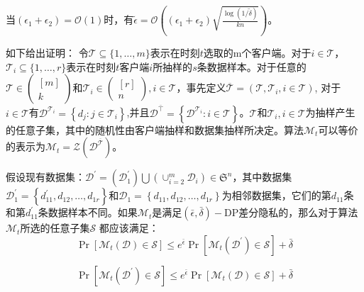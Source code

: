 当$\left(\epsilon_{1}+\epsilon_{2}\right)=\mathcal{O}(1)$时，有$\tilde{\epsilon}=\mathcal{O}\left(\left(\epsilon_{1}+\epsilon_{2}\right) \sqrt{\frac{\log (1 / \tilde{\delta})}{k n}}\right)$。

如下给出证明：
令$\mathcal{T} \subseteq\{1, \ldots, m\}$表示在时刻$t$选取的m个客户端。对于$i \in \mathcal{T}$，$\mathcal{T}_{i} \subseteq\{1, \ldots, r\}$表示在时刻$t$客户端$i$所抽样的$s$条数据样本。对于任意的 $\mathcal{T} \in\left(\begin{array}{c}{[m]} \\ k\end{array}\right)$和$\mathcal{T}_{i} \in\left(\begin{array}{c}{[r]} \\ n\end{array}\right), i \in \mathcal{T}$，事先定义$\overline{\mathcal{T}}=\left(\mathcal{T}, \mathcal{T}_{i}, i \in \mathcal{T}\right)$, 对于 $i \in \mathcal{T}$有$\mathcal{D}^{\mathcal{T}_{i}}=\left\{d_{j}: j \in \mathcal{T}_{i}\right\}$,并且$\mathcal{D}^{\bar{\top}}=\left\{\mathcal{D}^{\mathcal{T}_{i}}: i \in \mathcal{T}\right\}$。$\mathcal{T}$和$\mathcal{T}_{i}, i \in \mathcal{T}$为抽样产生的任意子集，其中的随机性由客户端抽样和数据集抽样所决定。算法$\mathcal{M}_{t}$可以等价的表示为$\mathcal{M}_{t}=\mathcal{Z}\left(\mathcal{D}^{\overline{\mathcal{T}}}\right)$。

假设现有数据集：$\mathcal{D}^{\prime}=\left(\mathcal{D}_{1}^{\prime}\right) \bigcup\left(\cup_{i=2}^{m} \mathcal{D}_{i}\right) \in \mathfrak{S}^{n}$，其中数据集$\mathcal{D}_{1}^{\prime}=\left\{d_{11}^{\prime}, d_{12}, \ldots, d_{1 r}\right\}$和$\mathcal{D}_{1}=\left\{d_{11}, d_{12}, \ldots, d_{1 r}\right\}$为相邻数据集，它们的第$d_{11}$条和第$d_{11}^{\prime}$条数据样本不同。如果$\mathcal{M}_{t}$是满足$(\bar{\epsilon}, \bar{\delta})-\mathrm{DP}$差分隐私的，那么对于算法$\mathcal{M}_{t}$所选的任意子集$\mathcal{S}$ 都应该满足：
\begin{equation}\label{eq:隐私性证明3}
\operatorname{Pr}\left[\mathcal{M}_{t}(\mathcal{D}) \in \mathcal{S}\right] \leq e^{\bar{\epsilon}} \operatorname{Pr}\left[\mathcal{M}_{t}\left(\mathcal{D}^{\prime}\right) \in \mathcal{S}\right]+\bar{\delta}
\end{equation}

\begin{equation}\label{eq:隐私性证明4}
\operatorname{Pr}\left[\mathcal{M}_{t}\left(\mathcal{D}^{\prime}\right) \in \mathcal{S}\right] \leq e^{\bar{\epsilon}} \operatorname{Pr}\left[\mathcal{M}_{t}(\mathcal{D}) \in \mathcal{S}\right]+\bar{\delta}
\end{equation}

